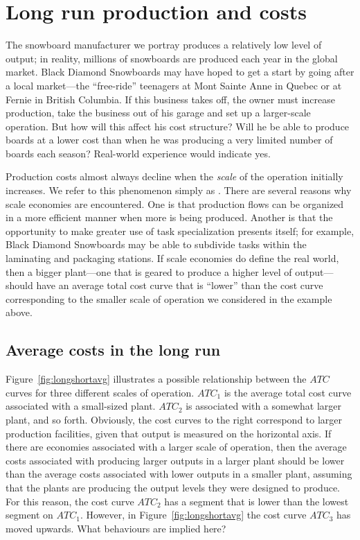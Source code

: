 \section{Long run production and costs}\label{sec:ch8sec6}

The snowboard manufacturer we portray produces a relatively low level of output; in reality, millions of snowboards are produced each year in the global market. Black Diamond Snowboards may have hoped to get a start by going after a local market---the ``free-ride'' teenagers at Mont Sainte Anne in Quebec or at Fernie in British Columbia. If this business takes off, the owner must increase production, take the business out of his garage and set up a larger-scale operation. But how will this affect his cost structure? Will he be able to produce boards at a lower cost than when he was producing a very limited number of boards each season? Real-world experience would indicate yes. 

Production costs almost always decline when the \textit{scale} of the operation initially increases. We refer to this phenomenon simply as . There are several reasons why scale economies are encountered. One is that production flows can be organized in a more efficient manner when more is being produced. Another is that the opportunity to make greater use of task specialization presents itself; for example, Black Diamond Snowboards may be able to subdivide tasks within the laminating and packaging stations. If scale economies do define the real world, then a bigger plant---one that is geared to produce a higher level of output---should have an average total cost curve that is ``lower'' than the cost curve corresponding to the smaller scale of operation we considered in the example above.

\subsection*{Average costs in the long run}

Figure~\ref{fig:longshortavg} illustrates a possible relationship between the $ATC$ curves for three different scales of operation. $ATC_1$ is the average total cost curve associated with a small-sized plant. $ATC_2$ is associated with a somewhat larger plant, and so forth. Obviously, the cost curves to the right correspond to larger production facilities, given that output is measured on the horizontal axis. If there are economies associated with a larger scale of operation, then the average costs associated with producing larger outputs in a larger plant should be lower than the average costs associated with lower outputs in a smaller plant, assuming that the plants are producing the output levels they were designed to produce. For this reason, the cost curve $ATC_2$ has a segment that is lower than the lowest segment on $ATC_1$. However, in Figure~\ref{fig:longshortavg} the cost curve $ATC_3$ has moved upwards. What behaviours are implied here?

